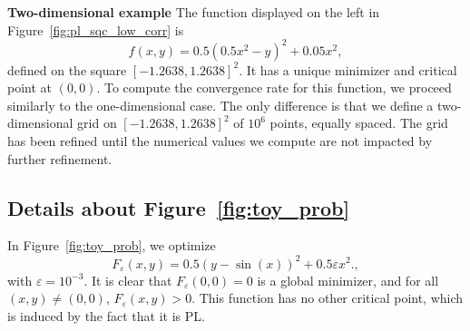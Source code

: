 \documentclass{article}
\theoremstyle{plain}
\theoremstyle{definition}
\theoremstyle{remark}
\begin{document}
\textbf{Two-dimensional example \:}
The function displayed on the left in Figure~\ref{fig:pl_sqc_low_corr} is
\[f(x,y) = 0.5(0.5x^2 -y)^2 + 0.05x^2,\]
defined on the square $[-1.2638,1.2638]^2$. It has a unique minimizer and critical point at $(0,0)$. To compute the convergence rate for this function, we proceed similarly to the one-dimensional case. The only difference is that we define a two-dimensional grid on $[-1.2638,1.2638]^2$ of $10^6$ points, equally spaced. The grid has been refined until the numerical values we compute are not impacted by further refinement.



\subsection{Details about Figure~\ref{fig:toy_prob}}\label{app:toy_prob}

In Figure~\ref{fig:toy_prob}, we optimize
\[F_{\varepsilon}(x,y) = 0.5(y-\sin(x))^2 + 0.5\varepsilon x^2.,\]
with $\varepsilon =10^{-3}$. It is clear that $F_{\varepsilon}(0,0) = 0$ is a global minimizer, and for all $(x,y) \neq (0,0)$, $F_{\varepsilon}(x,y) > 0$. This function has no other critical point, which is induced by the fact that it is PL.
\end{document}
